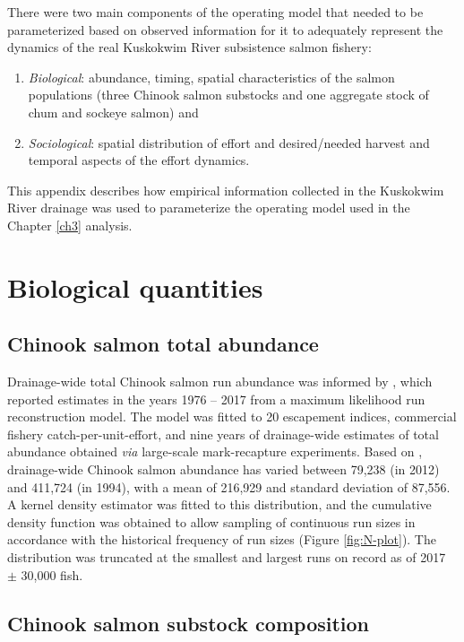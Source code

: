 \documentclass[12pt,]{book}
\theoremstyle{definition}
\theoremstyle{definition}
\theoremstyle{definition}
\theoremstyle{remark}
\begin{document}
\noindent
There were two main components of the operating model that needed to be
parameterized based on observed information for it to adequately
represent the dynamics of the real Kuskokwim River subsistence salmon
fishery:

\begin{enumerate}
\def\labelenumi{(\arabic{enumi})}
\item
  \emph{Biological}: abundance, timing, spatial characteristics of the
  salmon populations (three Chinook salmon substocks and one aggregate
  stock of chum and sockeye salmon) and
\item
  \emph{Sociological}: spatial distribution of effort and desired/needed
  harvest and temporal aspects of the effort dynamics.
\end{enumerate}

\noindent
This appendix describes how empirical information collected in the
Kuskokwim River drainage was used to parameterize the operating model
used in the Chapter \ref{ch3} analysis.

\section{Biological quantities}\label{biological-quantities}

\subsection{Chinook salmon total abundance}\label{mse-data-N}

\noindent
Drainage-wide total Chinook salmon run abundance was informed by
\citet{liller-etal-2018}, which reported estimates in the years 1976 --
2017 from a maximum likelihood run reconstruction model. The model was
fitted to 20 escapement indices, commercial fishery
catch-per-unit-effort, and nine years of drainage-wide estimates of
total abundance obtained \emph{via} large-scale mark-recapture
experiments. Based on \citet{liller-etal-2018}, drainage-wide Chinook
salmon abundance has varied between 79,238 (in 2012) and 411,724 (in
1994), with a mean of 216,929 and standard deviation of 87,556. A kernel
density estimator was fitted to this distribution, and the cumulative
density function was obtained to allow sampling of continuous run sizes
in accordance with the historical frequency of run sizes (Figure
\ref{fig:N-plot}). The distribution was truncated at the smallest and
largest runs on record as of 2017 \(\pm\) 30,000 fish.

\subsection{Chinook salmon substock composition}\label{mse-data-pi}
\end{document}
